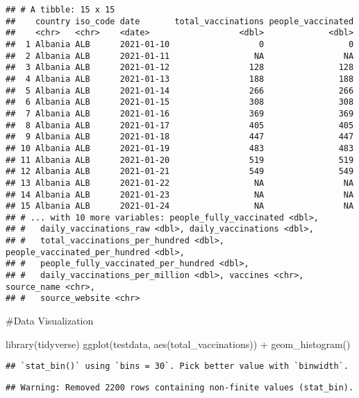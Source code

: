 \documentclass[
]{article}
\newenvironment{Shaded}{\begin{snugshade}}{\end{snugshade}}
\newcommand{\FunctionTok}[1]{\textcolor[rgb]{0.00,0.00,0.00}{#1}}
\newcommand{\NormalTok}[1]{#1}
\newcommand{\SpecialCharTok}[1]{\textcolor[rgb]{0.00,0.00,0.00}{#1}}
\begin{document}
\begin{verbatim}
## # A tibble: 15 x 15
##    country iso_code date       total_vaccinations people_vaccinated
##    <chr>   <chr>    <date>                  <dbl>             <dbl>
##  1 Albania ALB      2021-01-10                  0                 0
##  2 Albania ALB      2021-01-11                 NA                NA
##  3 Albania ALB      2021-01-12                128               128
##  4 Albania ALB      2021-01-13                188               188
##  5 Albania ALB      2021-01-14                266               266
##  6 Albania ALB      2021-01-15                308               308
##  7 Albania ALB      2021-01-16                369               369
##  8 Albania ALB      2021-01-17                405               405
##  9 Albania ALB      2021-01-18                447               447
## 10 Albania ALB      2021-01-19                483               483
## 11 Albania ALB      2021-01-20                519               519
## 12 Albania ALB      2021-01-21                549               549
## 13 Albania ALB      2021-01-22                 NA                NA
## 14 Albania ALB      2021-01-23                 NA                NA
## 15 Albania ALB      2021-01-24                 NA                NA
## # ... with 10 more variables: people_fully_vaccinated <dbl>,
## #   daily_vaccinations_raw <dbl>, daily_vaccinations <dbl>,
## #   total_vaccinations_per_hundred <dbl>, people_vaccinated_per_hundred <dbl>,
## #   people_fully_vaccinated_per_hundred <dbl>,
## #   daily_vaccinations_per_million <dbl>, vaccines <chr>, source_name <chr>,
## #   source_website <chr>
\end{verbatim}

\#Data Visualization

\begin{Shaded}
\begin{Highlighting}[]
\FunctionTok{library}\NormalTok{(tidyverse)}
\FunctionTok{ggplot}\NormalTok{(testdata, }\FunctionTok{aes}\NormalTok{(total\_vaccinations)) }\SpecialCharTok{+} \FunctionTok{geom\_histogram}\NormalTok{()}
\end{Highlighting}
\end{Shaded}

\begin{verbatim}
## `stat_bin()` using `bins = 30`. Pick better value with `binwidth`.
\end{verbatim}

\begin{verbatim}
## Warning: Removed 2200 rows containing non-finite values (stat_bin).
\end{verbatim}
\end{document}
